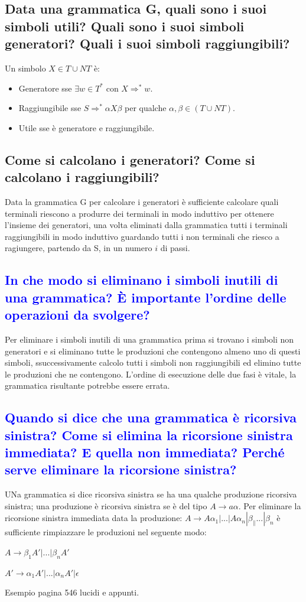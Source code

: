 \documentclass{article}
\begin{document}
\subsection{Data una grammatica G, quali sono i suoi simboli utili? Quali sono i suoi simboli generatori? Quali i suoi simboli raggiungibili?}
Un simbolo $X \in T \cup NT$ è:
\begin{itemize}
    \item Generatore sse $\exists w \in T^*$ con $X \Rightarrow^* w$.
    \item Raggiungibile sse $S \Rightarrow^* \alpha X \beta$ per qualche $\alpha, \beta
              \in (T \cup NT)$.
    \item Utile sse è generatore e raggiungibile.
\end{itemize}

\subsection{Come si calcolano i generatori? Come si calcolano i raggiungibili?}
Data la grammatica G per calcolare i generatori è sufficiente calcolare quali
terminali riescono a produrre dei terminali in modo induttivo per ottenere
l'insieme dei generatori, una volta eliminati dalla grammatica tutti i
terminali raggiungibili in modo induttivo guardando tutti i non terminali che
riesco a ragiungere, partendo da S, in un numero $i$ di passi.
\subsection{\textcolor{blue}{In che modo si eliminano i simboli inutili di una grammatica? È importante l'ordine delle operazioni da svolgere?}}
Per eliminare i simboli inutili di una grammatica prima si trovano i simboli non generatori e si eliminano tutte le produzioni che contengono almeno uno di questi simboli, ssuccessivamente
calcolo tutti i simboli non raggiungibili ed elimino tutte le produzioni che ne contengono. L'ordine di esecuzione delle due fasi è vitale, la grammatica risultante potrebbe essere errata.

\subsection{\textcolor{blue}{Quando si dice che una grammatica è ricorsiva sinistra? Come si elimina la ricorsione sinistra immediata?
        E quella non immediata? Perché serve eliminare la ricorsione sinistra?}}
UNa grammatica si dice ricorsiva sinistra se ha una qualche produzione ricorsiva sinistra; una produzione è ricorsiva sinistra se è del tipo $A \to a\alpha$.
Per eliminare la ricorsione sinistra immediata data la produzione: $A \to A\alpha_1|...| A\alpha_n|\beta_\|...|\beta_n$ è sufficiente rimpiazzare le produzioni nel seguente modo:
\begin{center}
    $A \to \beta_1A'|...| \beta_nA'$

    $A'\to \alpha_1A'|...|\alpha_nA'|\epsilon$
\end{center}
Esempio pagina 546 lucidi e appunti.
\end{document}
